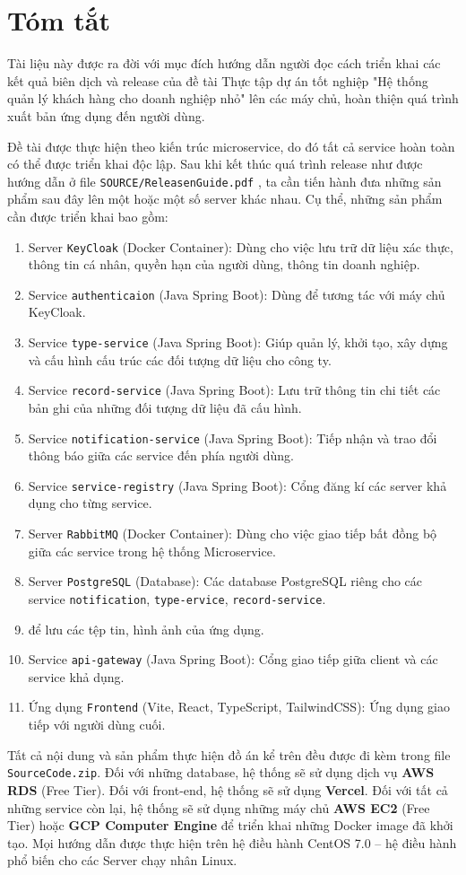 \chapter*{Tóm tắt}
\label{summary}
Tài liệu này được ra đời với mục đích hướng dẫn người đọc cách triển khai các kết quả biên dịch và release của đề tài Thực tập dự án tốt nghiệp "Hệ thống quản lý khách hàng cho doanh nghiệp nhỏ" lên các máy chủ, hoàn thiện quá trình xuất bản ứng dụng đến người dùng.

Đề tài được thực hiện theo kiến trúc microservice, do đó tất cả service hoàn toàn có thể được triển khai độc lập. Sau khi kết thúc quá trình release như được hướng dẫn ở file \texttt{SOURCE/ReleasenGuide.pdf} , ta cần tiến hành đưa những sản phẩm sau đây lên một hoặc một số server khác nhau.
Cụ thể, những sản phẩm cần được triển khai bao gồm:
\begin{enumerate}
    \item Server \texttt{KeyCloak} (Docker Container): Dùng cho việc lưu trữ dữ liệu xác thực, thông tin cá nhân, quyền hạn của người dùng, thông tin doanh nghiệp.
    \item Service \texttt{authenticaion} (Java Spring Boot): Dùng để tương tác với máy chủ KeyCloak.
    \item Service \texttt{type-service} (Java Spring Boot): Giúp quản lý, khởi tạo, xây dựng và cấu hình cấu trúc các đối tượng dữ liệu cho công ty.
    \item Service \texttt{record-service} (Java Spring Boot): Lưu trữ thông tin chi tiết các bản ghi của những đối tượng dữ liệu đã cấu hình.
    \item Service \texttt{notification-service} (Java Spring Boot): Tiếp nhận và trao đổi thông báo giữa các service đến phía người dùng.
    \item Service \texttt{service-registry} (Java Spring Boot): Cổng đăng kí các server khả dụng cho từng service.
    \item Server \texttt{RabbitMQ} (Docker Container): Dùng cho việc giao tiếp bất đồng bộ giữa các service trong hệ thống Microservice.
    \item Server \texttt{PostgreSQL} (Database): Các database PostgreSQL riêng cho các service \texttt{notification}, \texttt{type-ervice}, \texttt{record-service}.
    \item {} để lưu các tệp tin, hình ảnh của ứng dụng.
    \item Service \texttt{api-gateway} (Java Spring Boot): Cổng giao tiếp giữa client và các service khả dụng.
    \item Ứng dụng \texttt{Frontend} (Vite, React, TypeScript, TailwindCSS): Ứng dụng giao tiếp với người dùng cuối.
\end{enumerate}

Tất cả nội dung và sản phẩm thực hiện đồ án kể trên đều được đi kèm trong file \texttt{SourceCode.zip}. Đối với những database, hệ thống sẽ sử dụng dịch vụ \textbf{AWS RDS} (Free Tier).
Đối với front-end, hệ thống sẽ sử dụng \textbf{Vercel}. Đối với tất cả những service còn lại, hệ thống sẽ sử dụng những máy chủ \textbf{AWS EC2} (Free Tier) hoặc \textbf{GCP Computer Engine} để triển khai những Docker image đã khởi tạo.
Mọi hướng dẫn được thực hiện trên hệ điều hành CentOS 7.0 -- hệ điều hành phổ biến cho các Server chạy nhân Linux.
